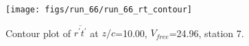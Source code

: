 \begin{figure}[H]
\centering
\texttt{[image: figs/run\_66/run\_66\_rt\_contour]}
\caption{Contour plot of $\overline{r^\prime t^\prime}$ at $z/c$=10.00, $V_{free}$=24.96, station 7.}
\end{figure}


